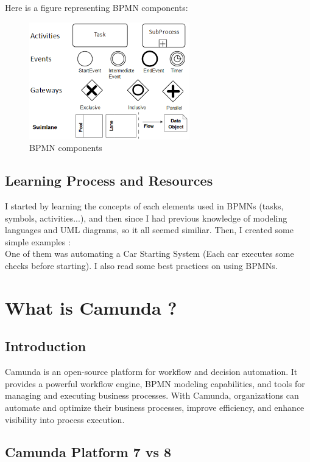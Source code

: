 \documentclass[12pt]{article}
\begin{document}
{  \pagebreak

  Here is a figure representing BPMN components:

  \begin{figure}[h]
    \centering
    \includegraphics[width=.35\linewidth]{bpmn.png}
    \caption{BPMN components}
    \label{fig:bpmn}
  \end{figure}

  \subsection{Learning Process and Resources}
  I started by learning the concepts of each elements used in BPMNs (tasks, symbols, activities...), and then since I had previous knowledge of modeling languages and UML diagrams, so it all seemed similiar.
  Then, I created some simple examples :
  \\
  One of them was automating a Car Starting System (Each car executes some checks before starting).
  I also read some best practices on using BPMNs.

  \section{What is Camunda ?}

  \subsection{Introduction}

  Camunda is an open-source platform for workflow and decision automation. It provides a powerful workflow engine, BPMN modeling capabilities, and tools for managing and executing business processes. With Camunda, organizations can automate and optimize their business processes, improve efficiency, and enhance visibility into process execution.

  \pagebreak

  \subsection{Camunda Platform 7 vs 8}

}
\end{document}
